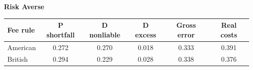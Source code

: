 \documentclass[10pt,border=5pt,varwidth=17cm]{standalone}
\begin{document}
\begingroup
\small
\setlength{\tabcolsep}{5pt}
\renewcommand{\arraystretch}{1.20}
\noindent\textbf{Risk Averse}\par\smallskip
\noindent\begin{tabularx}{\linewidth}{@{}>{\raggedright\arraybackslash}Xccccc@{}}
\toprule
\textbf{Fee rule} & \textbf{P shortfall} & \textbf{D nonliable} & \textbf{D excess} & \textbf{Gross error} & \textbf{Real costs} \\
\midrule
American & 0.272 & 0.270 & 0.018 & 0.333 & 0.391 \\
British & 0.294 & 0.229 & 0.028 & 0.338 & 0.376 \\
\bottomrule\end{tabularx}\par\medskip
\endgroup
\end{document}
